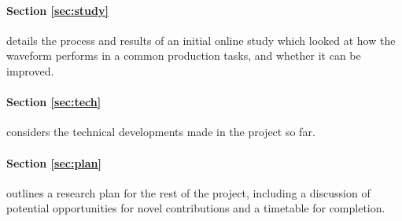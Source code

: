 \paragraph{Section \ref{sec:study}} details the process and results of an
initial online study which looked at how the waveform performs in a common
production tasks, and whether it can be improved.

\paragraph{Section \ref{sec:tech}} considers the technical developments made in
the project so far.

\paragraph{Section \ref{sec:plan}} outlines a research plan for the rest of the
project, including a discussion of potential opportunities for novel
contributions and a timetable for completion.
